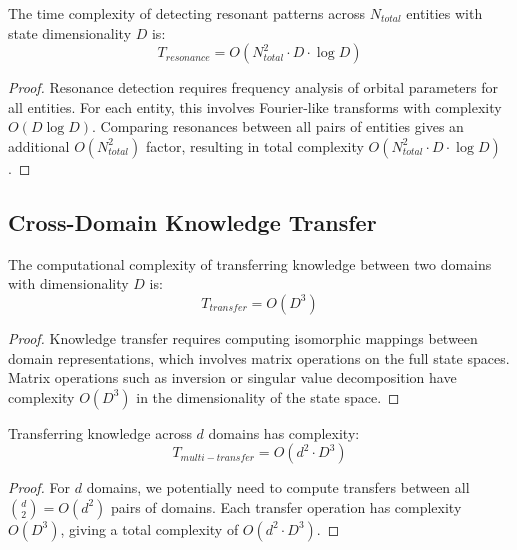 \begin{theorem}
The time complexity of detecting resonant patterns across $N_{total}$ entities with state dimensionality $D$ is:
\begin{equation}
T_{resonance} = O(N_{total}^2 \cdot D \cdot \log D)
\end{equation}
\end{theorem}

\begin{proof}
Resonance detection requires frequency analysis of orbital parameters for all entities. For each entity, this involves Fourier-like transforms with complexity $O(D \log D)$. Comparing resonances between all pairs of entities gives an additional $O(N_{total}^2)$ factor, resulting in total complexity $O(N_{total}^2 \cdot D \cdot \log D)$.
\end{proof}

\subsection{Cross-Domain Knowledge Transfer}

\begin{theorem}
The computational complexity of transferring knowledge between two domains with dimensionality $D$ is:
\begin{equation}
T_{transfer} = O(D^3)
\end{equation}
\end{theorem}

\begin{proof}
Knowledge transfer requires computing isomorphic mappings between domain representations, which involves matrix operations on the full state spaces. Matrix operations such as inversion or singular value decomposition have complexity $O(D^3)$ in the dimensionality of the state space.
\end{proof}

\begin{theorem}
Transferring knowledge across $d$ domains has complexity:
\begin{equation}
T_{multi-transfer} = O(d^2 \cdot D^3)
\end{equation}
\end{theorem}

\begin{proof}
For $d$ domains, we potentially need to compute transfers between all $\binom{d}{2} = O(d^2)$ pairs of domains. Each transfer operation has complexity $O(D^3)$, giving a total complexity of $O(d^2 \cdot D^3)$.
\end{proof}

